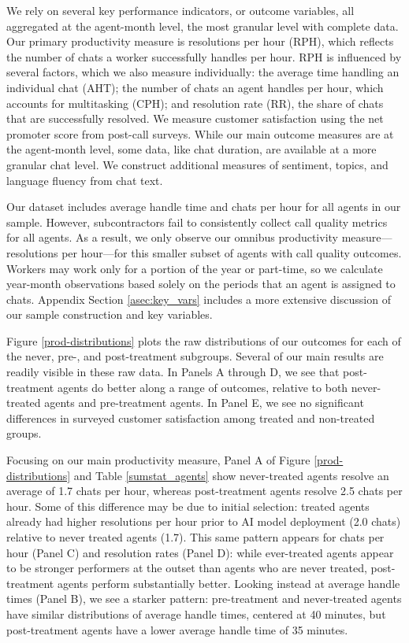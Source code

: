 \documentclass[11pt]{article}
\begin{document}
We rely on several key performance indicators, or outcome variables, all aggregated at the agent-month level, the most granular level with complete data.  Our primary productivity measure is resolutions per hour (RPH), which reflects the number of chats a worker successfully handles per hour. RPH is influenced by several factors, which we also measure individually: the average time handling an individual chat (AHT); the number of chats an agent handles per hour, which accounts for multitasking (CPH); and resolution rate (RR), the share of chats that are successfully resolved. We measure customer satisfaction using the net promoter score from post-call surveys.  While our main outcome measures are at the agent-month level, some data, like chat duration, are available at a more granular chat level.  We construct additional measures of sentiment, topics, and language fluency from chat text.

Our dataset includes average handle time and chats per hour for all agents in our sample. However, subcontractors fail to consistently collect call quality metrics for all agents. As a result, we only observe our omnibus productivity measure---resolutions per hour---for this smaller subset of agents with call quality outcomes. Workers may work only for a portion of the year or part-time, so we calculate year-month observations based solely on the periods that an agent is assigned to chats.
Appendix Section \ref{asec:key_vars} includes a more extensive discussion of our sample construction and key variables. 

Figure \ref{prod-distributions} plots the raw distributions of our outcomes for each of the never, pre-, and post-treatment subgroups.  Several of our main results are readily visible in these raw data.  In Panels A through D, we see that post-treatment agents do better along a range of outcomes, relative to both never-treated agents and pre-treatment agents.  In Panel E, we see no significant differences in surveyed customer satisfaction among treated and non-treated groups. 

Focusing on our main productivity measure, Panel A of Figure \ref{prod-distributions} and Table \ref{sumstat_agents} show never-treated agents resolve an average of 1.7 chats per hour, whereas post-treatment agents resolve 2.5 chats per hour.  Some of this difference may be due to initial selection: treated agents already had higher resolutions per hour prior to AI model deployment (2.0 chats) relative to never treated agents (1.7).  This same pattern appears for chats per hour (Panel C) and resolution rates (Panel D): while ever-treated agents appear to be stronger performers at the outset than agents who are never treated, post-treatment agents perform substantially better.  Looking instead at average handle times (Panel B), we see a starker pattern: pre-treatment and never-treated agents have similar distributions of average handle times, centered at 40 minutes, but post-treatment agents have a lower average handle time of 35 minutes.
\end{document}

